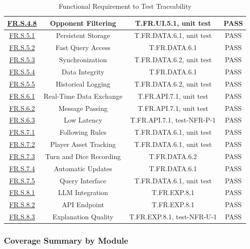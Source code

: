 \documentclass[12pt, titlepage]{article}
\begin{document}
\begin{table}[H]
{\begin{tabular}{|c|c|c|c|}
\hyperref[FR.S.4.8]{FR.S.4.8} & Opponent Filtering & T.FR.UI.5.1, unit test & PASS \\ \hline
\hyperref[FR.S.5.1]{FR.S.5.1} & Persistent Storage & T.FR.DATA.6.1, unit test & PASS \\ \hline
\hyperref[FR.S.5.2]{FR.S.5.2} & Fast Query Access & T.FR.DATA.6.1 & PASS \\ \hline
\hyperref[FR.S.5.3]{FR.S.5.3} & Synchronization & T.FR.DATA.6.2, unit test & PASS \\ \hline
\hyperref[FR.S.5.4]{FR.S.5.4} & Data Integrity & T.FR.DATA.6.1 & PASS \\ \hline
\hyperref[FR.S.5.5]{FR.S.5.5} & Historical Logging & T.FR.DATA.6.2, unit test & PASS \\ \hline
\hyperref[FR.S.6.1]{FR.S.6.1} & Real-Time Data Exchange & T.FR.API.7.1, unit test & PASS \\ \hline
\hyperref[FR.S.6.2]{FR.S.6.2} & Message Passing & T.FR.API.7.1, unit test & PASS \\ \hline
\hyperref[FR.S.6.3]{FR.S.6.3} & Low Latency & T.FR.API.7.1, test-NFR-P-1 & PASS \\ \hline
\hyperref[FR.S.7.1]{FR.S.7.1} & Following Rules & T.FR.DATA.6.1, unit test & PASS \\ \hline
\hyperref[FR.S.7.2]{FR.S.7.2} & Player Asset Tracking & T.FR.DATA.6.1, unit test & PASS \\ \hline
\hyperref[FR.S.7.3]{FR.S.7.3} & Turn and Dice Recording & T.FR.DATA.6.2 & PASS \\ \hline
\hyperref[FR.S.7.4]{FR.S.7.4} & Automatic Updates & T.FR.DATA.6.1 & PASS \\ \hline
\hyperref[FR.S.7.5]{FR.S.7.5} & Query Interface & T.FR.DATA.6.1, unit test & PASS \\ \hline
\hyperref[FR.S.8.1]{FR.S.8.1} & LLM Integration & T.FR.EXP.8.1 & PASS \\ \hline
\hyperref[FR.S.8.2]{FR.S.8.2} & API Endpoint & T.FR.EXP.8.1 & PASS \\ \hline
\hyperref[FR.S.8.3]{FR.S.8.3} & Explanation Quality & T.FR.EXP.8.1, test-NFR-U-1 & PASS \\ \hline
\end{tabular}

}
\caption{Functional Requirement to Test Traceability}
\label{tab:fr-trace}
\end{table}

\subsubsection{Coverage Summary by Module}
\end{document}
